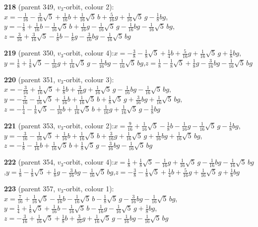 \documentclass[10pt]{article}
\begin{document}
{\noindent\textbf{218} (parent 349, $v_3$-orbit, colour 2):\quad $x=-\tfrac{1}{16}-\tfrac{3}{16}\sqrt5+\tfrac{1}{16}b+\tfrac{1}{16}\sqrt5\,b+\tfrac{5}{16}g+\tfrac{1}{16}\sqrt5\,g-\tfrac{1}{8}bg$,\quad $y=-\tfrac{1}{8}+\tfrac{1}{16}b-\tfrac{1}{16}\sqrt5\,b+\tfrac{1}{16}g-\tfrac{1}{16}\sqrt5\,g-\tfrac{1}{16}bg-\tfrac{1}{16}\sqrt5\,bg$,\quad $z=\tfrac{3}{16}+\tfrac{3}{16}\sqrt5-\tfrac{1}{8}b-\tfrac{1}{8}g-\tfrac{3}{16}bg-\tfrac{1}{16}\sqrt5\,bg$\par\smallskip
\noindent\textbf{219} (parent 350, $v_3$-orbit, colour 4):\quad $x=-\tfrac{3}{8}-\tfrac{1}{8}\sqrt5+\tfrac{1}{4}b+\tfrac{5}{16}g+\tfrac{1}{16}\sqrt5\,g+\tfrac{1}{8}bg$,\quad $y=\tfrac{1}{8}+\tfrac{1}{8}\sqrt5-\tfrac{1}{16}g+\tfrac{1}{16}\sqrt5\,g-\tfrac{1}{16}bg-\tfrac{1}{16}\sqrt5\,bg$,\quad $z=\tfrac{1}{8}-\tfrac{1}{8}\sqrt5+\tfrac{1}{8}g-\tfrac{3}{16}bg-\tfrac{1}{16}\sqrt5\,bg$\par\smallskip
\noindent\textbf{220} (parent 351, $v_3$-orbit, colour 3):\quad $x=-\tfrac{3}{16}+\tfrac{1}{16}\sqrt5+\tfrac{1}{8}b+\tfrac{3}{16}g+\tfrac{1}{16}\sqrt5\,g-\tfrac{1}{16}bg-\tfrac{1}{16}\sqrt5\,bg$,\quad $y=-\tfrac{7}{16}-\tfrac{1}{16}\sqrt5+\tfrac{1}{16}b+\tfrac{1}{16}\sqrt5\,b+\tfrac{1}{8}\sqrt5\,g+\tfrac{3}{16}bg+\tfrac{1}{16}\sqrt5\,bg$,\quad $z=-\tfrac{1}{4}-\tfrac{1}{8}\sqrt5-\tfrac{1}{16}b+\tfrac{1}{16}\sqrt5\,b+\tfrac{1}{16}g+\tfrac{1}{16}\sqrt5\,g-\tfrac{1}{8}bg$\par\smallskip
\noindent\textbf{221} (parent 353, $v_3$-orbit, colour 2):\quad $x=\tfrac{9}{16}+\tfrac{1}{16}\sqrt5-\tfrac{1}{8}b-\tfrac{1}{16}g-\tfrac{1}{16}\sqrt5\,g-\tfrac{1}{8}bg$,\quad $y=-\tfrac{3}{16}-\tfrac{1}{16}\sqrt5+\tfrac{1}{16}b+\tfrac{1}{16}\sqrt5\,b+\tfrac{3}{16}g+\tfrac{1}{16}\sqrt5\,g+\tfrac{1}{16}bg+\tfrac{1}{16}\sqrt5\,bg$,\quad $z=-\tfrac{1}{8}-\tfrac{1}{16}b+\tfrac{1}{16}\sqrt5\,b+\tfrac{1}{8}\sqrt5\,g-\tfrac{3}{16}bg-\tfrac{1}{16}\sqrt5\,bg$\par\smallskip
\noindent\textbf{222} (parent 354, $v_3$-orbit, colour 4):\quad $x=\tfrac{1}{8}+\tfrac{1}{8}\sqrt5-\tfrac{1}{16}g+\tfrac{1}{16}\sqrt5\,g-\tfrac{1}{16}bg-\tfrac{1}{16}\sqrt5\,bg$,\quad $y=\tfrac{1}{8}-\tfrac{1}{8}\sqrt5+\tfrac{1}{8}g-\tfrac{3}{16}bg-\tfrac{1}{16}\sqrt5\,bg$,\quad $z=-\tfrac{3}{8}-\tfrac{1}{8}\sqrt5+\tfrac{1}{4}b+\tfrac{5}{16}g+\tfrac{1}{16}\sqrt5\,g+\tfrac{1}{8}bg$\par\smallskip
\noindent\textbf{223} (parent 357, $v_3$-orbit, colour 1):\quad $x=\tfrac{7}{16}+\tfrac{1}{16}\sqrt5-\tfrac{1}{16}b-\tfrac{1}{16}\sqrt5\,b-\tfrac{1}{8}\sqrt5\,g-\tfrac{3}{16}bg-\tfrac{1}{16}\sqrt5\,bg$,\quad $y=\tfrac{1}{4}+\tfrac{1}{8}\sqrt5+\tfrac{1}{16}b-\tfrac{1}{16}\sqrt5\,b-\tfrac{1}{16}g-\tfrac{1}{16}\sqrt5\,g+\tfrac{1}{8}bg$,\quad $z=-\tfrac{3}{16}+\tfrac{1}{16}\sqrt5+\tfrac{1}{8}b+\tfrac{3}{16}g+\tfrac{1}{16}\sqrt5\,g-\tfrac{1}{16}bg-\tfrac{1}{16}\sqrt5\,bg$\par\smallskip
}
\end{document}
